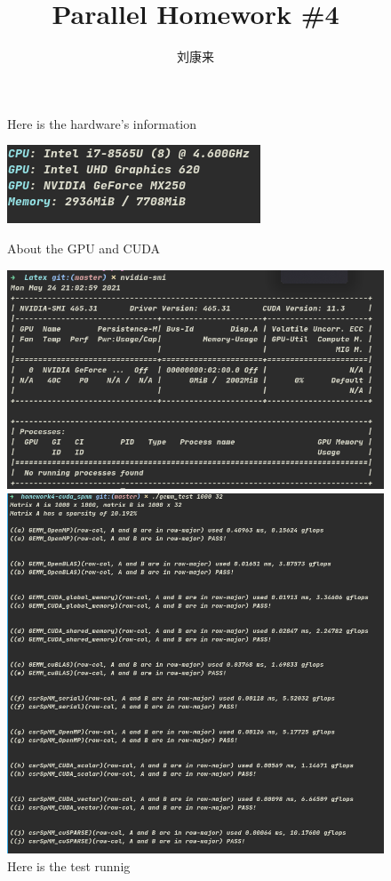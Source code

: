 \documentclass[12pt]{ctexart}
\title{Parallel Homework \#4}
\author{刘康来}
\begin{document}
\maketitle

\newpage

\begin{figure}[h!]
    \centering
    \caption{Here is the hardware's information}
    \includegraphics[scale=0.5]{HardwareInfo}
    \caption{About the GPU and CUDA}
    \includegraphics[scale=0.5]{Gpu}
    \caption{Here is the test runnig}
    \includegraphics[scale=0.5]{testrunning}
\end{figure}
\end{document}
